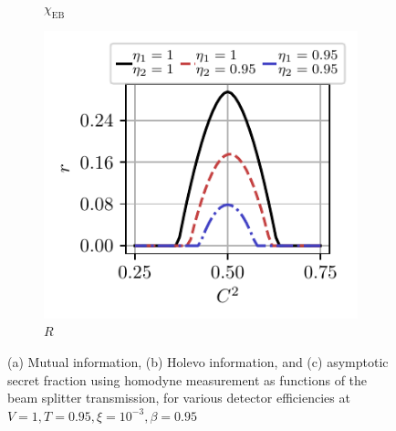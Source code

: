 \documentclass[%
reprint,
superscriptaddress,
 amsmath,amssymb,amsfonts,
 aps,
 pra,
 longbibliography
]{revtex4-2}
\newcommand{\ind}[1]{\mathrm{#1}}
\begin{document}
\begin{figure}
\begin{subfigure}[c]{.3\linewidth}
\caption[]{$\chi_{\ind{EB}}$}
\end{subfigure}
\hfill
    \begin{subfigure}[c]{.3\linewidth}
\includegraphics[width=\linewidth, trim={.2cm .3cm .4cm .35cm},clip]{pics/qkd/hom/r.pdf}
\caption[]{$R$}
        \end{subfigure}
        \caption{(a) Mutual information, (b) Holevo information, and (c) asymptotic secret fraction using homodyne measurement as functions of the beam splitter transmission, for various detector efficiencies at $V=1, T=0.95, \xi=10^{-3}, \beta=0.95$
}
\label{fig:homodyne-all}
\end{figure}
\end{document}
